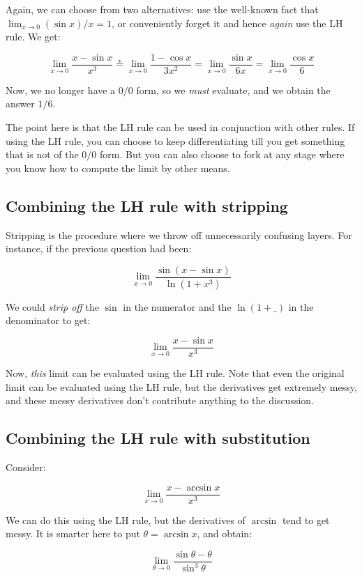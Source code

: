 \documentclass{amsart}
\begin{document}
Again, we can choose from two alternatives: use the well-known fact
that $\lim_{x \to 0} (\sin x)/x = 1$, or conveniently forget it and
hence {\em again} use the LH rule. We get:

$$\lim_{x \to 0} \frac{x - \sin x}{x^3} \stackrel{*}{=} \lim_{x \to 0} \frac{1 - \cos x}{3x^2} = \lim_{x \to 0} \frac{\sin x}{6x} = \lim_{x \to 0} \frac{\cos x}{6}$$

Now, we no longer have a $0/0$ form, so we {\em must} evaluate, and we
obtain the answer $1/6$.

The point here is that the LH rule can be used in conjunction with
other rules. If using the LH rule, you can choose to keep
differentiating till you get something that is not of the $0/0$
form. But you can also choose to fork at any stage where you know how
to compute the limit by other means.

\subsection{Combining the LH rule with stripping}

Stripping is the procedure where we throw off unnecessarily confusing
layers. For instance, if the previous question had been:

$$\lim_{x \to 0} \frac{\sin(x - \sin x)}{\ln(1 + x^3)}$$

We could {\em strip off} the $\sin$ in the numerator and the $\ln(1 +
\_)$ in the denominator to get:

$$\lim_{x \to 0} \frac{x - \sin x}{x^3}$$

Now, {\em this} limit can be evaluated using the LH rule. Note that
even the original limit can be evaluated using the LH rule, but the
derivatives get extremely messy, and these messy derivatives don't
contribute anything to the discussion.

\subsection{Combining the LH rule with substitution}

Consider:

$$\lim_{x \to 0} \frac{x - \arcsin x}{x^3}$$

We can do this using the LH rule, but the derivatives of $\arcsin$
tend to get messy. It is smarter here to put $\theta = \arcsin x$, and
obtain:

$$\lim_{\theta \to 0} \frac{\sin \theta - \theta}{\sin^3\theta}$$
\end{document}
